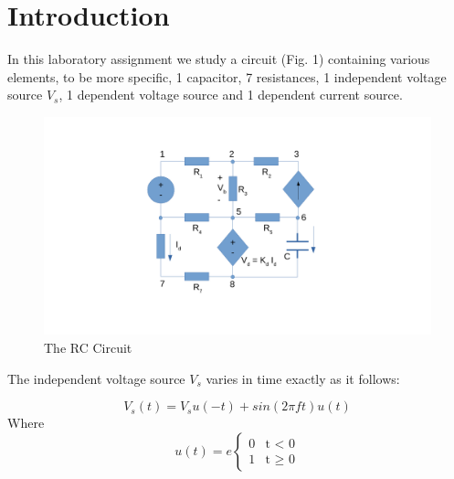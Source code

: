 \newpage
\section{Introduction}
\label{sec:introduction}

In this laboratory assignment we study a circuit (Fig. 1) containing various elements, to be more specific, 1 capacitor, 7 resistances, 1 independent voltage source $V_s$, 1 dependent voltage source and 1 dependent current source. %

\begin{figure}[H] 

\centering
\includegraphics[width=\textwidth]{circuit1.pdf}
\caption{The RC Circuit}
\label{fig:first}

\end{figure}



The independent voltage source $V_s$ varies in time exactly as it follows:

\begin{equation}
V_{s}(t) = V_{s}u(-t) + sin(2 \pi f t)u(t)
\label{equation1}
\end{equation}
Where
\begin{equation}
 u(t)= e
    \begin{cases}
     0 & \text{t $<$ 0}\\
      1 & \text{t $\geq$ 0}
    \end{cases} 
\label{eq:tt}      
\end{equation}


